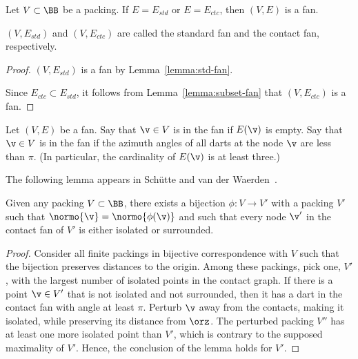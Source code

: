 \begin{lemma}[]
Let $V\subset \BB$ be a packing.  If $E=E_{std}$ or $E=E_{ctc}$, then
$(V,E)$ is a fan.
\end{lemma}
$(V,E_{std})$ and $(V,E_{ctc})$ are called the standard fan and
the contact fan, respectively.  
%
%
%
%
%
%
%

\begin{proof} 
$(V,E_{std})$ is a fan by Lemma~\ref{lemma:std-fan}.

Since $E_{ctc}\subset E_{std}$, it follows from
Lemma~\ref{lemma:subset-fan} that $(V,E_{ctc})$ is a fan.
\end{proof}

\begin{definition}
  Let $(V,E)$ be a fan.  Say that $\v\in V$ is  in
  the fan if $E(\v)$ is empty.  Say that $\v\in V$ is
   in the fan if the azimuth angles of all darts
  at the node $\v$ are less than $\pi$.  (In particular, the
  cardinality of $E(\v)$ is at least three.)
\end{definition}
%
%
%
%
%
%

The following lemma appears in Sch\"utte and van der
Waerden~\cite{vanderWaerden:1951}.

\begin{lemma}[]
\label{lemma:iso-surround}
Given any packing $V\subset \BB$,
there exists a bijection $\phi:V\to V'$ with a  packing $V'$ 
such that $\normo{\v} = \normo{\phi(\v)}$ and
such that every node $\v'$ in the contact fan of $V'$
is either isolated or surrounded.
\end{lemma}
%
%
%

\begin{proof} Consider all finite packings in bijective correspondence
  with $V$ such that the bijection preserves distances to
  the origin.  Among these packings, pick one, $V'$, with the largest
  number of isolated points in the contact graph.  If there is a point
  $\v\in V'$ that is not isolated and not surrounded, then it has a
  dart in the contact fan with angle at least $\pi$.  Perturb $\v$ away from the
  contacts, making it isolated, while preserving its distance from
  $\orz$.  The perturbed packing $V''$ has at least one more isolated point
  than $V'$, which is contrary to the supposed maximality of $V'$.
  Hence, the conclusion of the lemma holds for $V'$.
\end{proof}

